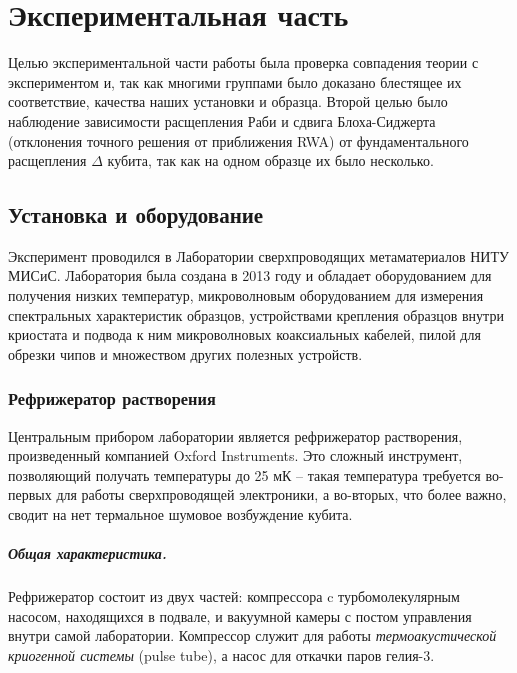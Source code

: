 \documentclass[12pt, twoside]{report}
\numberwithin{equation}{section}
\numberwithin{figure}{section}
\begin{document}
\chapter{Экспериментальная часть} \label{chap:exp}

Целью экспериментальной части работы была проверка совпадения теории с экспериментом и, так как многими группами было доказано блестящее их соответствие\cite{bishop2009, niemczyk2010, forn2010}, качества наших установки и образца. Второй целью было наблюдение зависимости расщепления Раби и сдвига Блоха-Сиджерта\cite{forn2010} (отклонения точного решения от приближения RWA) от фундаментального расщепления $\Delta$ кубита, так как на одном образце их было несколько. 

\section{Установка и оборудование}

Эксперимент проводился в Лаборатории сверхпроводящих метаматериалов НИТУ МИСиС. Лаборатория была создана в 2013 году и обладает оборудованием для получения низких температур, микроволновым оборудованием для измерения спектральных характеристик образцов, устройствами крепления образцов внутри криостата и подвода к ним микроволновых коаксиальных кабелей, пилой для обрезки чипов и множеством других полезных устройств. 

\subsection{Рефрижератор растворения}

Центральным прибором лаборатории является рефрижератор растворения, произведенный компанией Oxford Instruments. Это сложный инструмент, позволяющий получать температуры до 25 мК -- такая температура требуется во-первых для работы сверхпроводящей электроники, а во-вторых, что более важно, сводит на нет термальное шумовое возбуждение кубита. 

\paragraph{Общая характеристика.} Рефрижератор состоит из двух частей: компрессора c турбомолекулярным насосом, находящихся в подвале, и вакуумной камеры с постом управления внутри самой лаборатории. Компрессор служит для работы \textit{термоакустической криогенной системы} (pulse tube), а насос для откачки паров гелия-3.
\end{document}
